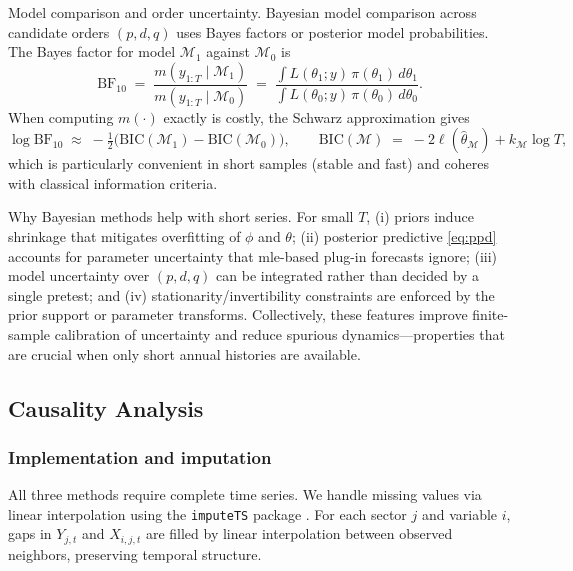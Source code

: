 \documentclass[preprint, 3p,
authoryear]{elsarticle} %
\begin{document}
Model comparison and order uncertainty. Bayesian model comparison across
candidate orders \((p,d,q)\) uses Bayes factors or posterior model
probabilities. The Bayes factor for model \(\mathcal{M}_1\) against
\(\mathcal{M}_0\) is \begin{equation}
\mathrm{BF}_{10} \;=\; \frac{m(y_{1:T}\mid \mathcal{M}_1)}{m(y_{1:T}\mid \mathcal{M}_0)}
\;=\; \frac{\int L(\theta_1;y)\,\pi(\theta_1)\,d\theta_1}{\int L(\theta_0;y)\,\pi(\theta_0)\,d\theta_0}.
\end{equation} When computing \(m(\cdot)\) exactly is costly, the
Schwarz approximation gives \begin{equation}
\log \mathrm{BF}_{10} \;\approx\; -\tfrac{1}{2}\Big(\mathrm{BIC}(\mathcal{M}_1)-\mathrm{BIC}(\mathcal{M}_0)\Big),
\qquad
\mathrm{BIC}(\mathcal{M}) \;=\; -2\ell(\widehat{\theta}_{\mathcal{M}}) + k_{\mathcal{M}}\log T,
\end{equation} which is particularly convenient in short samples (stable
and fast) and coheres with classical information criteria.

Why Bayesian methods help with short series. For small \(T\), (i) priors
induce shrinkage that mitigates overfitting of \(\phi\) and \(\theta\);
(ii) posterior predictive \eqref{eq:ppd} accounts for parameter
uncertainty that \gls{mle}-based plug-in forecasts ignore; (iii) model
uncertainty over \((p,d,q)\) can be integrated rather than decided by a
single pretest; and (iv) stationarity/invertibility constraints are
enforced by the prior support or parameter transforms. Collectively,
these features improve finite-sample calibration of uncertainty and
reduce spurious dynamics---properties that are crucial when only short
annual histories are available.

\subsection{Causality Analysis}\label{sec:calccaus}

\subsubsection{Implementation and imputation}\label{sec:imputation}

All three methods require complete time series. We handle missing values
via linear interpolation using the \texttt{imputeTS} package
\citep{moritz2017}. For each sector \(j\) and variable \(i\), gaps in
\(Y_{j,t}\) and \(X_{i,j,t}\) are filled by linear interpolation between
observed neighbors, preserving temporal structure.
\end{document}
